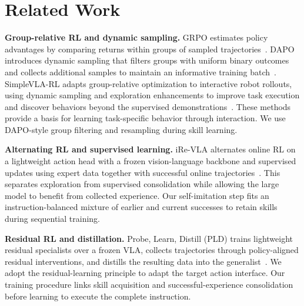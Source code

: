 \section{Related Work}\label{sec:related}
\textbf{Group-relative RL and dynamic sampling.} GRPO estimates policy advantages by comparing returns within groups of sampled trajectories~\cite{deepseekmath}. DAPO introduces dynamic sampling that filters groups with uniform binary outcomes and collects additional samples to maintain an informative training batch~\cite{dapo}. SimpleVLA-RL adapts group-relative optimization to interactive robot rollouts, using dynamic sampling and exploration enhancements to improve task execution and discover behaviors beyond the supervised demonstrations~\cite{simplevlarl}. These methods provide a basis for learning task-specific behavior through interaction. We use DAPO-style group filtering and resampling during skill learning.

\textbf{Alternating RL and supervised learning.} iRe-VLA alternates online RL on a lightweight action head with a frozen vision-language backbone and supervised updates using expert data together with successful online trajectories~\cite{irevla}. This separates exploration from supervised consolidation while allowing the large model to benefit from collected experience. Our self-imitation step fits an instruction-balanced mixture of earlier and current successes to retain skills during sequential training.

\textbf{Residual RL and distillation.} Probe, Learn, Distill (PLD) trains lightweight residual specialists over a frozen VLA, collects trajectories through policy-aligned residual interventions, and distills the resulting data into the generalist~\cite{pld}. We adopt the residual-learning principle to adapt the target action interface. Our training procedure links skill acquisition and successful-experience consolidation before learning to execute the complete instruction.
